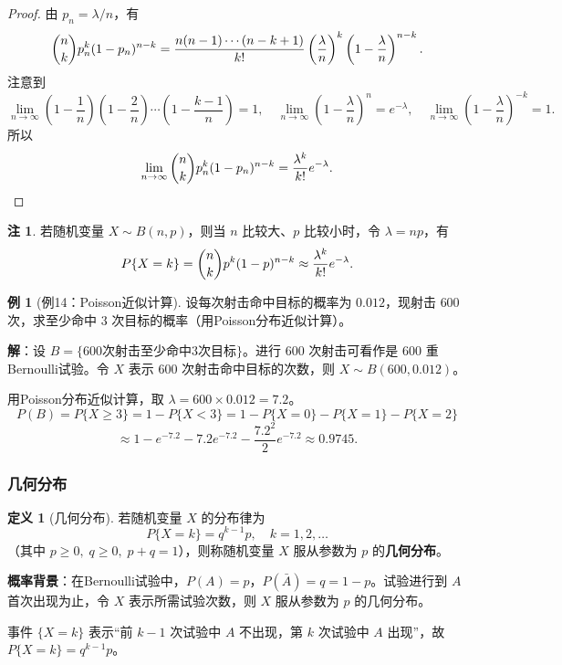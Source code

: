 \documentclass[11pt,a4paper]{report}
\theoremstyle{definition}
\newtheorem{definition}{定义}[chapter]
\newtheorem{example}{例}[chapter]
\newtheorem{note}{注}[chapter]
\begin{document}
\begin{proof}
由 $p_n = \lambda/n$，有
\[
\dbinom{n}{k}p_n^k(1-p_n)^{n-k} = \frac{n(n-1)\cdots(n-k+1)}{k!}\left(\frac{\lambda}{n}\right)^k\left(1-\frac{\lambda}{n}\right)^{n-k}.
\]
注意到
\[
\lim_{n\to\infty}\left(1-\frac{1}{n}\right)\left(1-\frac{2}{n}\right)\cdots\left(1-\frac{k-1}{n}\right)=1, \quad \lim_{n\to\infty}\left(1-\frac{\lambda}{n}\right)^n = e^{-\lambda}, \quad \lim_{n\to\infty}\left(1-\frac{\lambda}{n}\right)^{-k}=1.
\]
所以
\[
\lim_{n\to\infty}\dbinom{n}{k}p_n^k(1-p_n)^{n-k} = \frac{\lambda^k}{k!}e^{-\lambda}.
\]
\end{proof}

\begin{note}
若随机变量 $X \sim B(n,p)$，则当 $n$ 比较大、$p$ 比较小时，令 $\lambda=np$，有
\[
P\{X=k\} = \dbinom{n}{k}p^k(1-p)^{n-k} \approx \frac{\lambda^k}{k!}e^{-\lambda}.
\]
\end{note}

\begin{example}[例14：Poisson近似计算]
设每次射击命中目标的概率为 $0.012$，现射击 $600$ 次，求至少命中 $3$ 次目标的概率（用Poisson分布近似计算）。
\end{example}

\textbf{解}：设 $B=\{600\text{次射击至少命中3次目标}\}$。进行 $600$ 次射击可看作是 $600$ 重Bernoulli试验。令 $X$ 表示 $600$ 次射击命中目标的次数，则 $X \sim B(600,0.012)$。

用Poisson分布近似计算，取 $\lambda = 600 \times 0.012 = 7.2$。
\[
P(B) = P\{X \geq 3\} = 1 - P\{X < 3\} = 1 - P\{X=0\} - P\{X=1\} - P\{X=2\}
\]
\[
\approx 1 - e^{-7.2} - 7.2e^{-7.2} - \frac{7.2^2}{2}e^{-7.2} \approx \boxed{0.9745}.
\]

\subsubsection{几何分布}

\begin{definition}[几何分布]
若随机变量 $X$ 的分布律为
\[
\boxed{P\{X=k\} = q^{k-1}p, \quad k=1,2,\dots}
\]
（其中 $p \geq 0,\; q \geq 0,\; p+q=1$），则称随机变量 $X$ 服从参数为 $p$ 的\textbf{几何分布}。
\end{definition}

\textbf{概率背景}：在Bernoulli试验中，$P(A)=p$，$P(\bar{A})=q=1-p$。试验进行到 $A$ 首次出现为止，令 $X$ 表示所需试验次数，则 $X$ 服从参数为 $p$ 的几何分布。

事件 $\{X=k\}$ 表示``前 $k-1$ 次试验中 $A$ 不出现，第 $k$ 次试验中 $A$ 出现''，故 $P\{X=k\}=q^{k-1}p$。
\end{document}
